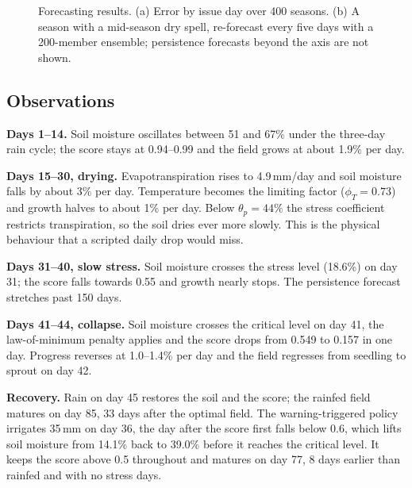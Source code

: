 \documentclass[conference]{IEEEtran}
\begin{document}
\begin{figure}[!t]
\caption{Forecasting results. (a) Error by issue day over 400 seasons. (b) A season with a
mid-season dry spell, re-forecast every five days with a 200-member ensemble; persistence
forecasts beyond the axis are not shown.}
\label{fig:fc}
\end{figure}

\subsection{Observations}
\textbf{Days 1--14.} Soil moisture oscillates between 51 and 67\% under the
three-day rain cycle; the score stays at 0.94--0.99 and the field grows at about
1.9\% per day.

\textbf{Days 15--30, drying.} Evapotranspiration rises to 4.9\,mm/day and soil moisture falls
by about 3\% per day. Temperature becomes the limiting factor ($\phi_T = 0.73$) and growth halves to
about 1\% per day. Below $\theta_p = 44\%$ the stress coefficient restricts transpiration, so the
soil dries ever more slowly. This is the physical behaviour that a scripted daily drop would miss.

\textbf{Days 31--40, slow stress.} Soil moisture crosses the stress level (18.6\%) on day
31; the score falls towards 0.55 and growth nearly stops. The persistence forecast
stretches past 150 days.

\textbf{Days 41--44, collapse.} Soil moisture crosses the critical level on day 41, the
law-of-minimum penalty applies and the score drops from 0.549 to 0.157 in one day. Progress
reverses at 1.0--1.4\% per day and the field regresses from seedling to sprout on day
42.

\textbf{Recovery.} Rain on day 45 restores the soil and the score; the rainfed field
matures on day 85, 33 days after the optimal field. The warning-triggered policy
irrigates 35\,mm on day 36, the day after the score first falls below 0.6, which lifts soil
moisture from 14.1\% back to 39.0\% before it reaches the critical level. It keeps the score
above 0.5 throughout and matures on day 77, 8 days earlier than rainfed and with no stress days.
\end{document}
